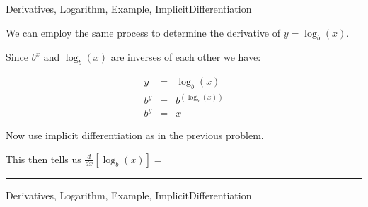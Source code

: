 \begin{tagblock}{Derivatives, Logarithm, Example, ImplicitDifferentiation}
\begin{question}

 We can employ the same process to determine the derivative of  $y = \log_b(x)$.  
 
 Since $b^x$ and $\log_b(x)$ are inverses of each other we have:
 
 \begin{eqnarray*} y &=& \log_b(x) \\
 b^y & = & b^(\log_b(x)) \\
 b^y & = & x \end{eqnarray*}
 
 Now use implicit differentiation as in the previous problem.

 \vspace{2in}
 
 This then tells us $\frac{d}{dx}[\log_b(x)] = $ \rule[-0.1cm]{2.5cm}{0.01cm}


	
\begin{tags}
	   Derivatives, Logarithm, Example, ImplicitDifferentiation
\end{tags}
	
\begin{diary}
\end{diary}
	
\begin{solution}
	   
\end{solution}
	
\end{question}

\end{tagblock}


